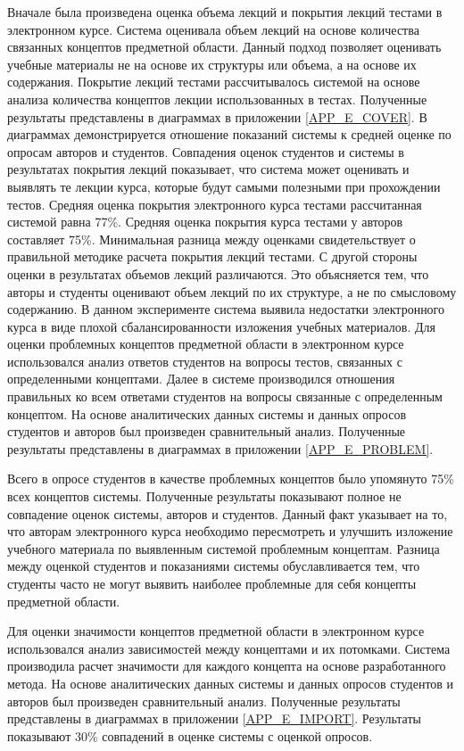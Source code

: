 Вначале была произведена оценка объема лекций и покрытия лекций тестами в электронном курсе. Система оценивала объем лекций на основе количества связанных концептов предметной области. Данный подход позволяет оценивать учебные материалы не на основе их структуры или объема, а на основе их содержания. Покрытие лекций тестами рассчитывалось системой на основе анализа количества концептов лекции использованных в тестах. Полученные результаты представлены в диаграммах в приложении \ref{APP_E_COVER}. В диаграммах демонстрируется отношение показаний системы к средней оценке по опросам авторов и студентов. Совпадения оценок студентов и системы в результатах покрытия лекций показывает, что система может оценивать и выявлять те лекции курса, которые будут самыми полезными при прохождении тестов. Средняя оценка покрытия электронного курса тестами рассчитанная системой равна 77\%. Средняя оценка покрытия курса тестами у авторов составляет 75\%. Минимальная разница между оценками свидетельствует о правильной методике расчета покрытия лекций тестами. С другой стороны оценки в результатах объемов лекций различаются. Это объясняется тем, что авторы и студенты оценивают объем лекций по их структуре, а не по смысловому содержанию. В данном эксперименте система выявила недостатки электронного курса в виде плохой сбалансированности изложения учебных материалов.      
Для оценки проблемных концептов предметной области в электронном курсе использовался анализ ответов студентов на вопросы тестов, связанных с определенными концептами. Далее в системе производился отношения правильных ко всем ответами студентов на вопросы связанные с определенным концептом. На основе аналитических данных системы и данных опросов студентов и авторов был произведен сравнительный анализ. Полученные результаты представлены в диаграммах в приложении \ref{APP_E_PROBLEM}. 

Всего в опросе студентов в качестве проблемных концептов было упомянуто 75\% всех концептов системы. Полученные результаты показывают полное не совпадение оценок системы, авторов и студентов. Данный факт указывает на то, что авторам  электронного курса необходимо пересмотреть и улучшить изложение учебного материала по выявленным системой проблемным концептам. Разница между оценкой студентов и показаниями системы обуславливается тем, что студенты часто не могут выявить наиболее проблемные для себя концепты предметной области.

Для оценки значимости концептов предметной области в электронном курсе использовался анализ зависимостей между концептами и их потомками. Система производила расчет значимости для каждого концепта на основе разработанного метода. На основе аналитических данных системы и данных опросов студентов и авторов был произведен сравнительный анализ. Полученные результаты представлены в диаграммах в приложении \ref{APP_E_IMPORT}. Результаты показывают 30\% совпадений в оценке системы с оценкой опросов. 

